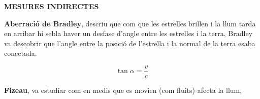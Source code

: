 \documentclass[12pt]{article}
\begin{document}
\noindent \textbf{MESURES INDIRECTES}

\begin{tcolorbox}[
    colback=white,      
    colframe=black,    
    coltext=black,     
    boxrule=1pt,        
    arc=0pt 
  ]           

  \textbf{Aberració de Bradley}, descriu que com que les estrelles brillen i la llum tarda en arribar hi sebla haver un desfase d'angle entre les estrelles i la terra, Bradley va descobrir que l'angle entre la posició de l'estrella i la normal de la terra esaba conectada.

  \[\tan\alpha = \frac{v}{c}\]

\end{tcolorbox}
\begin{tcolorbox}[
    colback=white,      
    colframe=black,    
    coltext=black,     
    boxrule=1pt,        
    arc=0pt 
  ]           

  \textbf{Fizeau}, va estudiar com en medis que es movien (com fluits) afecta la llum,
  
  \begin{center}
        \newcommand{\arr}[3]{%
      \begin{scope}[shift={(#1,#2)}, rotate=#3]
        \fill[cR] (0.12,0) -- (-0.1,0.07) -- (-0.1,-0.07) -- cycle;
      \end{scope}}
    \newcommand{\flow}[3]{%
      \begin{scope}[shift={(#1,#2)}, rotate=#3]
        \draw[cK, line width=2.5pt] (-0.3,0) -- (0,0);
        \fill[cK] (0.2,0) -- (-0.1,0.16) -- (-0.1,-0.16) -- cycle;
      \end{scope}}
    \newcommand{\mirror}[4]{%
      \begin{scope}[shift={(#1,#2)}, rotate=#3]
        \draw[cK, line width=1pt] (-0.85,0) -- (0.85,0);
        \foreach \t in {-0.7,-0.5,...,0.7}
          \draw[cK, line width=0.5pt] (\t,0) -- ({\t-0.12},{#4*0.2});
      \end{scope}}
\end{center}
\end{tcolorbox}
\end{document}

